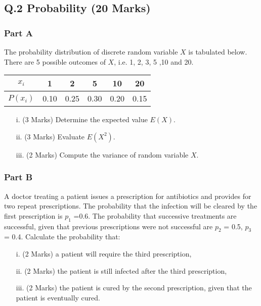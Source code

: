 
\subsection*{Q.2 Probability (20 Marks)}
\subsubsection*{Part A}
 The probability distribution of discrete random variable $X$ is tabulated below. There are 5 possible outcomes of $X$, i.e. 1, 2, 3, 5 ,10 and 20.
\begin{center}
\begin{tabular}{|c||c|c|c|c|c|}
\hline
$x_i$  & 1 & 2 & 5 & 10 & 20 \\\hline
$P(x_i)$ &  0.10 & 0.25 & 0.30& 0.20 &0.15\\

\hline
\end{tabular}
\end{center}

\begin{itemize}
\item[i.] (3 Marks) Determine the expected value $E(X)$.
\item[ii.] (3 Marks) Evaluate $E(X^2)$.
\item[iii.] (2 Marks) Compute the variance of random variable $X$.
\end{itemize}

\subsubsection*{Part B} %
A doctor treating a patient issues a prescription for antibiotics and provides for two repeat prescriptions. The probability that the infection will be cleared by the first prescription is $p_1$ =0.6.
The probability that successive treatments are successful, given that previous prescriptions were not successful are $p_2$ = 0.5, $p_3$ = 0.4. Calculate the probability that:

\begin{itemize}
\item[i.](2 Marks) a patient will require the third prescription,
\item[ii.](2 Marks) the patient is still infected after the third prescription,
\item[iii.](2 Marks) the patient is cured by the second prescription, given that the patient is eventually cured.
\end{itemize}
